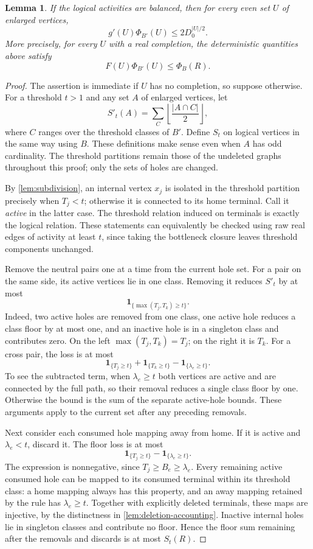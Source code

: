 \documentclass[11pt]{article}
\newtheorem{lemma}[theorem]{Lemma}
\theoremstyle{definition}
\theoremstyle{remark}
\newcommand{\one}{\mathbf 1}
\numberwithin{equation}{section}
\begin{document}
\begin{lemma}\label{lem:lifted-hole-bound}
If the logical activities are balanced, then for every even set
$U$ of enlarged vertices,
\[
 g'(U)\Phi_{B'}(U)\le2D_0^{|U|/2}.
\]
More precisely, for every $U$ with a real completion, the deterministic
quantities above satisfy
\begin{equation}\label{eq:threshold-charge}
 F(U)\Phi_{B'}(U)\le\Phi_B(R).
\end{equation}
\end{lemma}

\begin{proof}
The assertion is immediate if $U$ has no completion, so suppose
otherwise. For a threshold $t>1$ and any set $A$ of enlarged vertices,
let
\[
 S'_t(A)=\sum_{C}\left\lfloor\frac{|A\cap C|}{2}\right\rfloor,
\]
where $C$ ranges over the threshold classes of $B'$. Define $S_t$ on
logical vertices in the same way using $B$. These definitions make
sense even when $A$ has odd cardinality.
The threshold partitions remain those of the undeleted graphs
throughout this proof; only the sets of holes are changed.

By \cref{lem:subdivision}, an internal vertex $x_j$ is isolated in
the threshold partition precisely when $T_j<t$; otherwise it is
connected to its home terminal. Call it \emph{active} in the latter
case. The threshold relation induced on terminals is exactly the
logical relation. These statements can equivalently be checked using
raw real edges of activity at least $t$, since taking the bottleneck
closure leaves threshold components unchanged.

Remove the neutral pairs one at a time from the current hole set.
For a pair on the same side, its active vertices lie in one class.
Removing it reduces $S'_t$ by at most
\[
 \one_{\{\max(T_j,T_k)\ge t\}}.
\]
Indeed, two active holes are removed from one class, one active hole
reduces a class floor by at most one, and an inactive hole is in
a singleton class and contributes zero. On the left
$\max(T_j,T_k)=T_j$; on the right it is $T_k$. For a cross pair, the
loss is at most
\[
 \one_{\{T_j\ge t\}}+\one_{\{T_k\ge t\}}
 -\one_{\{\lambda_e\ge t\}}.
\]
To see the subtracted term, when $\lambda_e\ge t$ both vertices
are active and are connected by the full path, so their removal
reduces a single class floor by one. Otherwise the bound is the
sum of the separate active-hole bounds. These arguments apply to
the current set after any preceding removals.

Next consider each consumed hole mapping away from home. If it is
active and $\lambda_e<t$, discard it. The floor loss is at most
\[
 \one_{\{T_j\ge t\}}-\one_{\{\lambda_e\ge t\}}.
\]
The expression is nonnegative, since $T_j\ge B_e\ge\lambda_e$.
Every remaining active consumed hole can be mapped to its consumed
terminal within its threshold class: a home mapping always has this
property, and an away mapping retained by the rule has
$\lambda_e\ge t$. Together with explicitly deleted terminals, these
maps are injective, by the distinctness in
\cref{lem:deletion-accounting}. Inactive internal holes lie in
singleton classes and contribute no floor. Hence the floor sum
remaining after the removals and discards is at most $S_t(R)$.


\end{proof}
\end{document}
